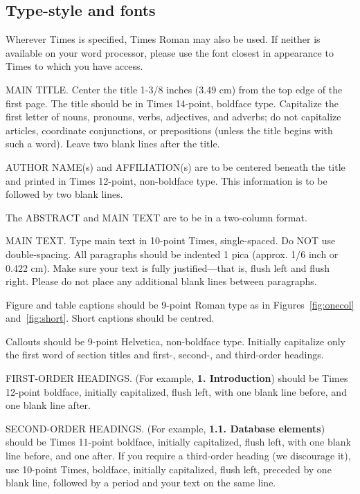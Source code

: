 \documentclass[10pt,twocolumn,letterpaper]{article}
\begin{document}
\subsection{Type-style and fonts}

Wherever Times is specified, Times Roman may also be used. If neither is
available on your word processor, please use the font closest in
appearance to Times to which you have access.

MAIN TITLE. Center the title 1-3/8 inches (3.49 cm) from the top edge of
the first page. The title should be in Times 14-point, boldface type.
Capitalize the first letter of nouns, pronouns, verbs, adjectives, and
adverbs; do not capitalize articles, coordinate conjunctions, or
prepositions (unless the title begins with such a word). Leave two blank
lines after the title.

AUTHOR NAME(s) and AFFILIATION(s) are to be centered beneath the title
and printed in Times 12-point, non-boldface type. This information is to
be followed by two blank lines.

The ABSTRACT and MAIN TEXT are to be in a two-column format.

MAIN TEXT. Type main text in 10-point Times, single-spaced. Do NOT use
double-spacing. All paragraphs should be indented 1 pica (approx. 1/6
inch or 0.422 cm). Make sure your text is fully justified---that is,
flush left and flush right. Please do not place any additional blank
lines between paragraphs.

Figure and table captions should be 9-point Roman type as in
Figures~\ref{fig:onecol} and~\ref{fig:short}.  Short captions should be centred.

\noindent Callouts should be 9-point Helvetica, non-boldface type.
Initially capitalize only the first word of section titles and first-,
second-, and third-order headings.

FIRST-ORDER HEADINGS. (For example, {\large \bf 1. Introduction})
should be Times 12-point boldface, initially capitalized, flush left,
with one blank line before, and one blank line after.

SECOND-ORDER HEADINGS. (For example, { \bf 1.1. Database elements})
should be Times 11-point boldface, initially capitalized, flush left,
with one blank line before, and one after. If you require a third-order
heading (we discourage it), use 10-point Times, boldface, initially
capitalized, flush left, preceded by one blank line, followed by a period
and your text on the same line.
\end{document}
